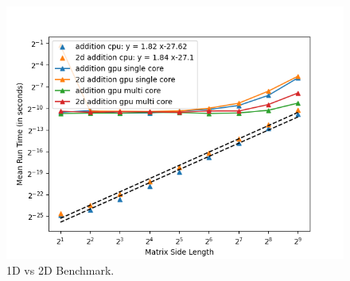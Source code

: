 \begin{figure}[ht]
    \centering
    \includegraphics[width=\textwidth]{SavedBenchmarksAndDiagrams/Machine 2/2D vs 1D.png}
    \caption{1D vs 2D Benchmark.}
    \label{fig:1d_vs_2d_bench}
\end{figure}
